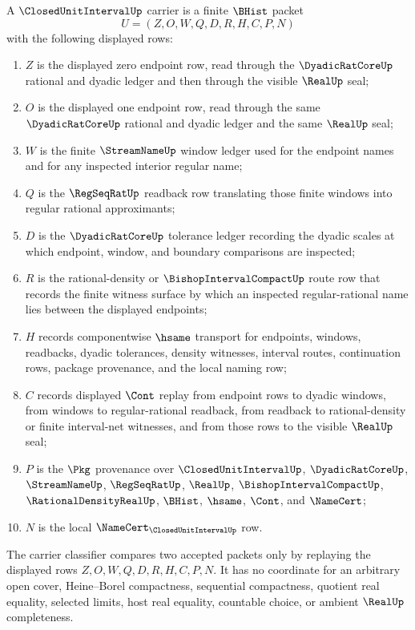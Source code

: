 \begin{definition}
\label{def:closed-unit-interval-carrier}
A $\ClosedUnitIntervalUp$ carrier is a finite $\BHist$ packet
$$
U=(Z,O,W,Q,D,R,H,C,P,N)
$$
with the following displayed rows:
\begin{enumerate}
\item $Z$ is the displayed zero endpoint row, read through the $\DyadicRatCoreUp$ rational and dyadic ledger and then through the visible $\RealUp$ seal;
\item $O$ is the displayed one endpoint row, read through the same $\DyadicRatCoreUp$ rational and dyadic ledger and the same $\RealUp$ seal;
\item $W$ is the finite $\StreamNameUp$ window ledger used for the endpoint names and for any inspected interior regular name;
\item $Q$ is the $\RegSeqRatUp$ readback row translating those finite windows into regular rational approximants;
\item $D$ is the $\DyadicRatCoreUp$ tolerance ledger recording the dyadic scales at which endpoint, window, and boundary comparisons are inspected;
\item $R$ is the rational-density or $\BishopIntervalCompactUp$ route row that records the finite witness surface by which an inspected regular-rational name lies between the displayed endpoints;
\item $H$ records componentwise $\hsame$ transport for endpoints, windows, readbacks, dyadic tolerances, density witnesses, interval routes, continuation rows, package provenance, and the local naming row;
\item $C$ records displayed $\Cont$ replay from endpoint rows to dyadic windows, from windows to regular-rational readback, from readback to rational-density or finite interval-net witnesses, and from those rows to the visible $\RealUp$ seal;
\item $P$ is the $\Pkg$ provenance over $\ClosedUnitIntervalUp$, $\DyadicRatCoreUp$, $\StreamNameUp$, $\RegSeqRatUp$, $\RealUp$, $\BishopIntervalCompactUp$, $\RationalDensityRealUp$, $\BHist$, $\hsame$, $\Cont$, and $\NameCert$;
\item $N$ is the local $\NameCert_{\ClosedUnitIntervalUp}$ row.
\end{enumerate}
The carrier classifier compares two accepted packets only by replaying the displayed rows $Z,O,W,Q,D,R,H,C,P,N$. It has no coordinate for an arbitrary open cover, Heine--Borel compactness, sequential compactness, quotient real equality, selected limits, host real equality, countable choice, or ambient $\RealUp$ completeness.
\end{definition}

